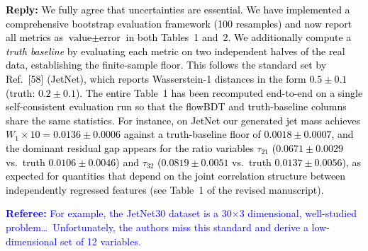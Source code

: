 \documentclass[11pt]{article}
\newcommand{\refcomment}[1]{\textcolor{blue}{\textbf{Referee:} #1}}
\newcommand{\reply}[1]{\textcolor{black}{\textbf{Reply:} #1}}
\begin{document}
\reply{We fully agree that uncertainties are essential. We have implemented a comprehensive bootstrap evaluation framework (100 resamples) and now report all metrics as $\text{value} \pm \text{error}$ in both Tables~1 and~2. We additionally compute a \emph{truth baseline} by evaluating each metric on two independent halves of the real data, establishing the finite-sample floor. This follows the standard set by Ref.~[58] (JetNet), which reports Wasserstein-1 distances in the form $0.5 \pm 0.1$ (truth: $0.2 \pm 0.1$). The entire Table~1 has been recomputed end-to-end on a single self-consistent evaluation run so that the flowBDT and truth-baseline columns share the same statistics. For instance, on JetNet our generated jet mass achieves $W_1 \times 10 = 0.0136 \pm 0.0006$ against a truth-baseline floor of $0.0018 \pm 0.0007$, and the dominant residual gap appears for the ratio variables $\tau_{21}$ ($0.0671 \pm 0.0029$ vs.\ truth $0.0106 \pm 0.0046$) and $\tau_{32}$ ($0.0819 \pm 0.0051$ vs.\ truth $0.0137 \pm 0.0056$), as expected for quantities that depend on the joint correlation structure between independently regressed features (see Table~1 of the revised manuscript).}

\bigskip

\refcomment{For example, the JetNet30 dataset is a 30$\times$3 dimensional, well-studied problem\ldots\ Unfortunately, the authors miss this standard and derive a low-dimensional set of 12 variables.}
\end{document}
